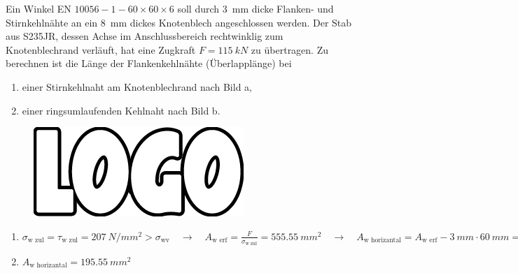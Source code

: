 \documentclass[11pt,a4paper]{scrartcl}
\begin{document}
\begin{question}
	Ein Winkel EN $10 056-1-60\times60\times6$ soll durch \SI{3}{mm} dicke Flanken- und Stirnkehlnähte	an ein \SI{8}{mm} dickes Knotenblech angeschlossen werden. Der Stab aus S235JR, dessen Achse im Anschlussbereich rechtwinklig zum Knotenblechrand verläuft, hat eine	Zugkraft $F=\SI{115}{kN}$ zu übertragen. Zu berechnen ist die Länge der Flankenkehlnähte (Überlapplänge) bei
	\begin{enumerate}
		\item einer Stirnkehlnaht am Knotenblechrand nach Bild a‚ \item einer ringsumlaufenden Kehlnaht nach Bild b.
	\end{enumerate}
	\begin{figure}[H]
	\centering\includegraphics[width=.8\columnwidth]{logo}
\end{figure}
\end{question}
\begin{solution}[print]
	\begin{enumerate}
		\item $\sigma_{\text{w zul}}=\tau_{\text{w zul}}=\SI{207}{N\per mm^2}>\sigma_{\text{wv}} \quad\rightarrow\quad A_{\text{w erf}}=\frac{F}{\sigma_{\text{w zul}}}=\SI{555.55}{mm^2} \quad\rightarrow\quad A_{\text{w horizantal}}= A_{\text{w erf}}-\SI{3}{mm}\cdot\SI{60}{mm}=\SI{375,55}{mm^2}\quad\rightarrow\quad l=\frac{A_{\text{w horizantal}}}{2\cdot a}=\SI{62.59}{mm}$
		\item $A_{\text{w horizantal}}=\SI{195.55}{mm^2}$
	\end{enumerate}
\end{solution}
\clearpage
\end{document}
